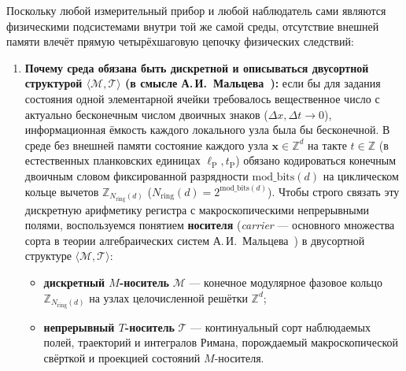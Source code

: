\documentclass[11pt,a4paper]{article}
\theoremstyle{plain}
\theoremstyle{definition}
\begin{document}
Поскольку любой измерительный прибор и любой наблюдатель сами являются физическими подсистемами внутри той же самой среды, отсутствие внешней памяти влечёт прямую четырёхшаговую цепочку физических следствий:
\begin{enumerate}[label=\textbf{Шаг \arabic*.},leftmargin=*]
\item \textbf{Почему среда обязана быть дискретной и описываться двусортной структурой $\langle\mathcal{M},\mathcal{T}\rangle$ (в смысле А.\,И.~Мальцева~\cite{Malcev1970}):}
  если бы для задания состояния одной элементарной ячейки требовалось вещественное число с актуально бесконечным числом двоичных знаков ($\Delta x,\Delta t\to 0$), информационная ёмкость каждого локального узла была бы бесконечной. В среде без внешней памяти состояние каждого узла $\mathbf{x}\in\mathbb{Z}^d$ на такте $t\in\mathbb{Z}$ (в естественных планковских единицах $\ell_{\mathrm{P}}, t_{\mathrm{P}}$) обязано кодироваться конечным двоичным словом фиксированной разрядности $\mathrm{mod\_bits}(d)$ на циклическом кольце вычетов $\mathbb{Z}_{N_{\mathrm{ring}}(d)}$ ($N_{\mathrm{ring}}(d) = 2^{\mathrm{mod\_bits}(d)}$). Чтобы строго связать эту дискретную арифметику регистра с макроскопическими непрерывными полями, воспользуемся понятием \textbf{носителя} (\emph{carrier} --- основного множества сорта в теории алгебраических систем А.\,И.~Мальцева~\cite{Malcev1970}) в двусортной структуре $\langle\mathcal{M},\mathcal{T}\rangle$:
  \begin{itemize}[noitemsep]
  \item \textbf{дискретный $M$-носитель} $\mathcal{M}$ --- конечное модулярное фазовое кольцо $\mathbb{Z}_{N_{\mathrm{ring}}(d)}$ на узлах целочисленной решётки $\mathbb{Z}^d$;
  \item \textbf{непрерывный $T$-носитель} $\mathcal{T}$ --- континуальный сорт наблюдаемых полей, траекторий и интегралов Римана, порождаемый макроскопической свёрткой и проекцией состояний $M$-носителя.
  \end{itemize}


\end{enumerate}
\end{document}
